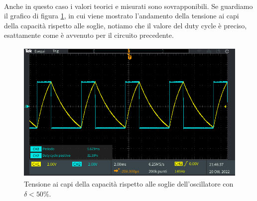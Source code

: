 \documentclass{report}
\begin{document}
\\[4pt]Anche in questo caso i valori teorici e misurati sono sovrapponibili. Se guardiamo il grafico di figura \ref{figura:oscillo4_2_soglie}, in cui viene mostrato l'andamento della tensione ai capi della capacità rispetto alle soglie, notiamo che il valore del duty cycle è preciso, esattamente come è avvenuto per il circuito precedente. 
\begin{figure}[h!]
	\centering
	\includegraphics[height=6.9cm]{immagini/TEK00036}
	\caption{Tensione ai capi della capacità rispetto alle soglie dell'oscillatore con $\delta<50\%$.}
	\label{figura:oscillo4_2_soglie}
\end{figure}

\end{document}
